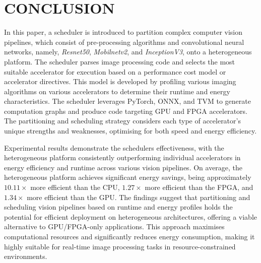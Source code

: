 \documentclass[]{spie}  %
\begin{document}
\label{sec:results}




\section{CONCLUSION}
\label{sec:conclusion}

In this paper, a scheduler is introduced to partition complex computer vision pipelines, which consist of pre-processing algorithms and convolutional neural networks, namely, \textit{Resnet50}, \textit{Mobilnetv2}, and \textit{InceptionV3}, onto a heterogeneous platform. The scheduler parses image processing code and selects the most suitable accelerator for execution based on a performance cost model or accelerator directives. This model is developed by profiling various imaging algorithms on various accelerators to determine their runtime and energy characteristics. The scheduler leverages PyTorch, ONNX, and TVM to generate computation graphs and produce code targeting GPU and FPGA accelerators. The partitioning and scheduling strategy considers each type of accelerator's unique strengths and weaknesses, optimising for both speed and energy efficiency. 

Experimental results demonstrate the schedulers effectiveness, with the heterogeneous platform consistently outperforming individual accelerators in energy efficiency and runtime across various vision pipelines. On average, the heterogeneous platform achieves significant energy savings, being approximately \(10.11\times\) more efficient than the CPU, \(1.27\times\) more efficient than the FPGA, and \(1.34\times\) more efficient than the GPU. The findings suggest that partitioning and scheduling vision pipelines based on runtime and energy profiles holds the potential for efficient deployment on heterogeneous architectures, offering a viable alternative to GPU/FPGA-only applications. This approach maximises computational resources and significantly reduces energy consumption, making it highly suitable for real-time image processing tasks in resource-constrained environments.
\end{document}
